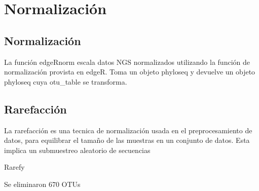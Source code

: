 


\section{Normalización}
\subsection{Normalización}


La función edgeRnorm escala datos NGS normalizados utilizando la función de normalización provista en edgeR. Toma un objeto phyloseq y devuelve un objeto phyloseq cuya otu\_table se transforma.

\subsection{Rarefacción}
La rarefacción es una tecnica de normalización usada en el preprocesamiento de datos, para equilibrar el tamaño de las muestras en un conjunto de datos. Esta implica un submuestreo aleatorio de secuencias

Rarefy 

Se eliminaron 670 OTUs






